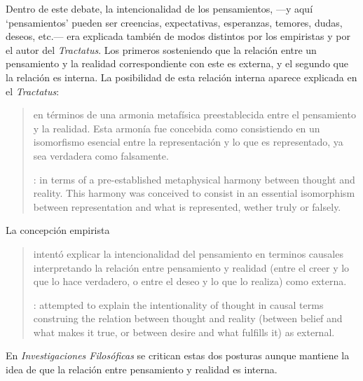 Dentro de este debate, la intencionalidad de los pensamientos, ---y aquí `pensamientos' pueden ser creencias, expectativas, esperanzas, temores, dudas, deseos, etc.--- era explicada también de modos distintos por los empiristas y por el autor del \emph{Tractatus}. Los primeros sosteniendo que la relación entre un pensamiento y la realidad correspondiente con este es externa, y el segundo que la relación es interna. La posibilidad de esta relación interna aparece explicada en el \emph{Tractatus}: \blockquote[{\cite[3]{hacker2000mind}}: in terms of a pre-established metaphysical harmony between thought and reality. This harmony was conceived to consist in an essential isomorphism between representation and what is represented, wether truly or falsely.]{en términos de una armonia metafísica preestablecida entre el pensamiento y la realidad. Esta armonía fue concebida como consistiendo en un isomorfismo esencial entre la representación y lo que es representado, ya sea verdadera como falsamente.} La concepción empirista \blockquote[{\cite[3]{hacker2000mind}}: attempted to explain the intentionality of thought in causal terms \textelp{} construing the relation between thought and reality (between belief and what makes it true, or between desire and what fulfills it) as external.]{intentó explicar la intencionalidad del pensamiento en terminos causales \textelp{} interpretando la relación entre pensamiento y realidad (entre el creer y lo que lo hace verdadero, o entre el deseo y lo que lo realiza) como externa.} En \emph{Investigaciones Filosóficas} se critican estas dos posturas aunque mantiene la idea de que la relación entre pensamiento y realidad es interna.

